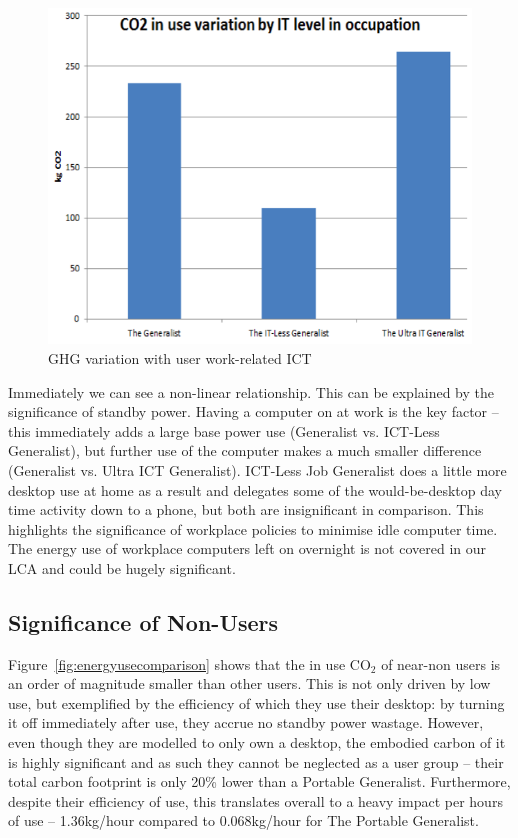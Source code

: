 \documentclass[conference]{IEEEtran}
\begin{document}
\begin{figure}[!ht]
\centering
\includegraphics[width=0.9\columnwidth]{images/ghgvariation_userworkrelatedit.png}
\caption{GHG variation with user work-related ICT}
\label{fig:ghgvariation_userworkrelatedit} 
\end{figure}

Immediately we can see a non-linear relationship. This can be
explained by the significance of standby power. Having a computer on
at work is the key factor -- this immediately adds a large base power
use (Generalist vs. ICT-Less Generalist), but further use of the
computer makes a much smaller difference (Generalist vs. Ultra ICT
Generalist). ICT-Less Job Generalist does a little more desktop use at
home as a result and delegates some of the would-be-desktop day time
activity down to a phone, but both are insignificant in
comparison. This highlights the significance of workplace policies to
minimise idle computer time. The energy use of workplace computers
left on overnight is not covered in our LCA and could be hugely
significant.

\subsection{Significance of Non-Users}

Figure~\ref{fig:energyusecomparison} shows that the in use CO$_2$ of
near-non users is an order of magnitude smaller than other users. This
is not only driven by low use, but exemplified by the efficiency of
which they use their desktop: by turning it off immediately after use,
they accrue no standby power wastage. However, even though they are
modelled to only own a desktop, the embodied carbon of it is highly
significant and as such they cannot be neglected as a user group --
their total carbon footprint is only 20\% lower than a Portable
Generalist. Furthermore, despite their efficiency of use, this
translates overall to a heavy impact per hours of use -- 1.36kg/hour
compared to 0.068kg/hour for The Portable Generalist.
\end{document}

